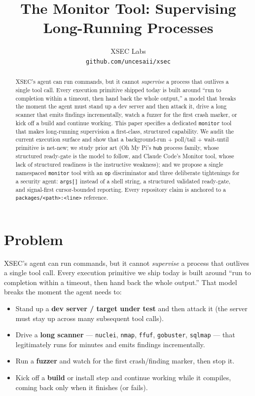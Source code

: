 \documentclass[11pt]{article}
\title{The Monitor Tool: Supervising Long-Running Processes}
\author{
  XSEC Labs \\
  \texttt{github.com/uncesaii/xsec}
}
\date{}
\begin{document}
\maketitle

\begin{abstract}
XSEC's agent can run commands, but it cannot \textit{supervise} a process that
outlives a single tool call. Every execution primitive shipped today is built
around ``run to completion within a timeout, then hand back the whole output,'' a
model that breaks the moment the agent must stand up a dev server and then attack
it, drive a long scanner that emits findings incrementally, watch a fuzzer for
the first crash marker, or kick off a build and continue working. This paper
specifies a dedicated \texttt{monitor} tool that makes long-running supervision a
first-class, structured capability. We audit the current execution surface and
show that a background-run + poll/tail + wait-until primitive is net-new; we
study prior art (Oh My Pi's \texttt{hub} process family, whose structured
ready-gate is the model to follow, and Claude Code's Monitor tool, whose lack of
structured readiness is the instructive weakness); and we propose a single
namespaced \texttt{monitor} tool with an \texttt{op} discriminator and three
deliberate tightenings for a security agent: \texttt{args[]} instead of a shell
string, a structured validated ready-gate, and signal-first cursor-bounded
reporting. Every repository claim is anchored to a
\texttt{packages/<path>:<line>} reference.
\end{abstract}

\section{Problem}

XSEC's agent can run commands, but it cannot \textit{supervise} a process that
outlives a single tool call. Every execution primitive we ship today is built
around ``run to completion within a timeout, then hand back the whole output.''
That model breaks the moment the agent needs to:

\begin{itemize}[leftmargin=*]
  \item Stand up a \textbf{dev server / target under test} and then attack it
  (the server must stay up across many subsequent tool calls).
  \item Drive a \textbf{long scanner} --- \texttt{nuclei}, \texttt{nmap},
  \texttt{ffuf}, \texttt{gobuster}, \texttt{sqlmap} --- that legitimately runs for
  minutes and emits findings incrementally.
  \item Run a \textbf{fuzzer} and watch for the first crash/finding marker, then
  stop it.
  \item Kick off a \textbf{build} or install step and continue working while it
  compiles, coming back only when it finishes (or fails).
\end{itemize}
\end{document}
